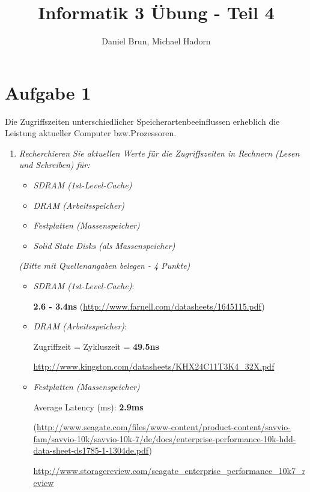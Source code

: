 \documentclass[10pt]{article}
\title{Informatik 3 Übung - Teil 4\vspace{-2ex}}
\author{Daniel Brun, Michael Hadorn\vspace{-2ex}}
\begin{document}
\maketitle

\section*{Aufgabe 1}
Die Zugriffszeiten unterschiedlicher Speicherartenbeeinflussen erheblich die Leistung aktueller Computer bzw.Prozessoren.
\begin{enumerate}[label=\alph*)]
	\item
		\textit{Recherchieren Sie aktuellen Werte für die Zugriffszeiten in Rechnern (Lesen und Schreiben) für:}
		\begin{itemize}
			\item \textit{SDRAM (1st-Level-Cache)}
			\item \textit{DRAM (Arbeitsspeicher)}
			\item \textit{Festplatten (Massenspeicher)}
			\item \textit{Solid State Disks (als Massenspeicher)}
		\end{itemize}
		\textit{(Bitte mit Quellenangaben belegen - 4 Punkte)}
		
		\begin{itemize}
			\item \textit{SDRAM (1st-Level-Cache)}:
			
			\textbf{2.6 - 3.4ns}
			(\url{http://www.farnell.com/datasheets/1645115.pdf})
			
			
			\item \textit{DRAM (Arbeitsspeicher)}:  
			
			
			Zugriffzeit = Zykluszeit = \textbf{49.5ns}
			

			
			\url{http://www.kingston.com/datasheets/KHX24C11T3K4_32X.pdf}
			
			
			\item \textit{Festplatten (Massenspeicher)}
			
			Average Latency (ms): \textbf{2.9ms}
			
			(\url{http://www.seagate.com/files/www-content/product-content/savvio-fam/savvio-10k/savvio-10k-7/de/docs/enterprise-performance-10k-hdd-data-sheet-ds1785-1-1304de.pdf})
			
			\url{http://www.storagereview.com/seagate_enterprise_performance_10k7_review}
			

\end{itemize}
\end{enumerate}
\end{document}
